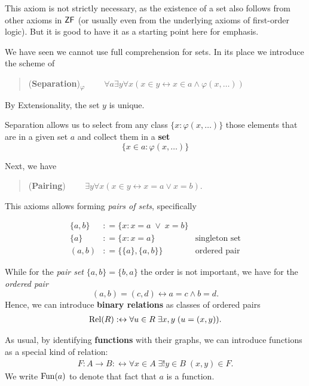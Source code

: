 This axiom is not strictly necessary, as the existence of a set also follows from other axioms in $\mathsf{ZF}$ (or usually even from the underlying axioms of first-order logic). But it is good to have it as a starting point here for emphasis.

We have seen we cannot use full comprehension for sets. In its place we introduce the scheme of

\begin{quote}
(\textbf{Separation})\textsubscript{$\varphi$} $\qquad  \forall a \exists y \forall x (x \in y \leftrightarrow x \in a \wedge \varphi(x,\ldots))$
\end{quote}

By Extensionality, the set $y$ is unique.

Separation allows us to select from any class $\{x \colon \varphi(x,\ldots)\}$ those elements that are in a given set $a$ and collect them in a \textbf{set}
\begin{equation*}
\{x \in a \colon \varphi(x,\ldots)\}
\end{equation*}

Next, we have

\begin{quote}
(\textbf{Pairing}) $\qquad \exists y \forall x( x \in y \leftrightarrow  x = a \vee x = b)$.
\end{quote}

This axioms allows forming \textit{pairs of sets}, specifically

\begin{align*}
    \{a,b\} & : =  \{x\colon x=a \; \vee \; x=b \} &    \\
    \{a\} &: = \{x\colon x=a  \} &    \text{singleton set}\\
    (a,b) &: =  \{\{a\},\{a,b\}\} &    \text{ordered pair}
\end{align*}

While for the \textit{pair set} $\{a,b\} = \{b,a\}$ the order is not important, we have for the \textit{ordered pair}
\begin{equation*}
(a,b) = (c,d) \leftrightarrow a = c \wedge b = d.
\end{equation*}
Hence, we can introduce \textbf{binary relations} as classes of ordered pairs
\begin{gather*}
    \operatorname{Rel}(R) :\leftrightarrow  \forall u \in R \; \exists x,y  \; (u =(x,y)).
\end{gather*}

As usual, by identifying \textbf{functions} with their graphs, we can introduce functions as a special kind of relation:
\begin{gather*}
F: A \to B :\leftrightarrow  \forall x \in A \; \exists ! y \in B \; (x,y) \in F.
\end{gather*}
We write $\operatorname{Fun}(a)$ to denote that fact that $a$ is a function.

